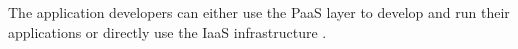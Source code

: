 

The application developers can either use the PaaS layer to develop and run their applications or directly use the IaaS infrastructure \cite{Lenk2009}.





